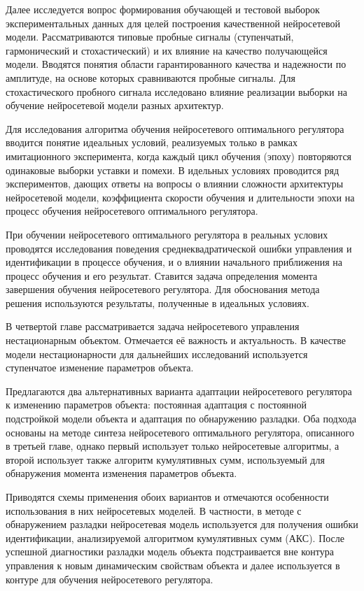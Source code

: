 Далее исследуется вопрос формирования обучающей и тестовой выборок
экспериментальных данных для целей построения качественной
нейросетевой модели.  Рассматриваются типовые пробные сигналы
(ступенчатый, гармонический и стохастический) и их влияние на качество
получающейся модели.  Вводятся понятия области гарантированного
качества и надежности по амплитуде, на основе которых сравниваются
пробные сигналы.  Для стохастического пробного сигнала исследовано
влияние реализации выборки на обучение нейросетевой модели разных
архитектур.

Для исследования алгоритма обучения нейросетевого оптимального
регулятора вводится понятие идеальных условий, реализуемых только в
рамках имитационного эксперимента, когда каждый цикл обучения (эпоху)
повторяются одинаковые выборки уставки и помехи.  В идельных условиях
проводится ряд экспериментов, дающих ответы на вопросы о влиянии
сложности архитектуры нейросетевой модели, коэффициента скорости
обучения и длительности эпохи на процесс обучения нейросетевого
оптимального регулятора.

При обучении нейросетевого оптимального регулятора в реальных услових
проводятся исследования поведения среднеквадратической ошибки
управления и идентификации в процессе обучения, и о влиянии начального
приближения на процесс обучения и его результат.  Ставится задача
определения момента завершения обучения нейросетевого регулятора.  Для
обоснования метода решения используются результаты, полученные в
идеальных условиях.



В четвертой главе рассматривается задача нейросетевого управления
нестационарным объектом.  Отмечается её важность и актуальность.  В
качестве модели нестационарности для дальнейших исследований
используется ступенчатое изменение параметров объекта.

Предлагаются два альтернативных варианта адаптации нейросетевого
регулятора к изменению параметров объекта: постоянная адаптация с
постоянной подстройкой модели объекта и адаптация по обнаружению
разладки.  Оба подхода основаны на методе синтеза нейросетевого
оптимального регулятора, описанного в третьей главе, однако первый
использует только нейросетевые алгоритмы, а второй использует также
алгоритм кумулятивных сумм, используемый для обнаружения момента
изменения параметров объекта.

Приводятся схемы применения обоих вариантов и отмечаются особенности
использования в них нейросетевых моделей.  В частности, в методе с
обнаружением разладки нейросетевая модель используется для получения
ошибки идентификации, анализируемой алгоритмом кумулятивных сумм
(АКС).  После успешной диагностики разладки модель объекта
подстраивается вне контура управления к новым динамическим свойствам
объекта и далее используется в контуре для обучения нейросетевого
регулятора.

